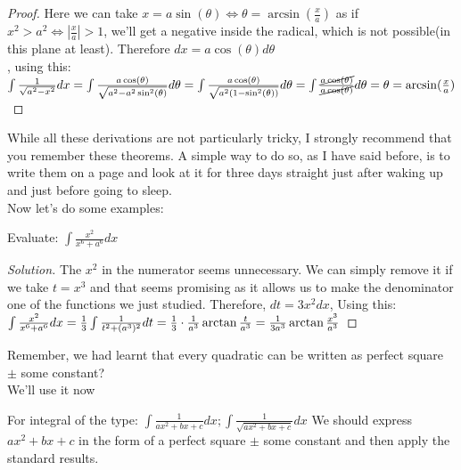\begin{proof}
    Here we can take $x=a\sin(\theta) \iff \theta = \arcsin(\frac{x}{a})$ as if $x^2>a^2 \iff |\frac{x}{a}|>1$, we'll get a negative inside the radical, which is not possible(in this plane at least). Therefore $dx=a\cos(\theta)d\theta$\\, using this:\\
    $
    \int \frac{1}{\sqrt{a^2-x^2}} dx\\
    = \int \frac{a\cos(\theta)}{\sqrt{a^2-a^2\sin^2(\theta)}} d\theta\\
    = \int \frac{a\cos(\theta)}{\sqrt{a^2(1-\sin^2(\theta))}}d\theta\\
    = \int \frac{\cancel{a\cos(\theta)}}{\cancel{a\cos(\theta)}}d\theta\\
    = \theta \\
    = \arcsin(\frac{x}{a})
    $
\end{proof}
While all these derivations are not particularly tricky, I strongly recommend that you remember these theorems. A simple way to do so, as I have said before, is to write them on a page and look at it for three days straight just after waking up and just before going to sleep.\\
Now let's do some examples:\\
\begin{example}
    Evaluate: $\int \frac{x^2}{x^6+a^6} dx$
\end{example}
\begin{proof}
    [Solution]
    The $x^2$ in the numerator seems unnecessary. We can simply remove it if we take $t=x^3$ and that seems promising as it allows us to make the denominator one of the functions we just studied. Therefore, $dt=3x^2dx$, Using this:\\
    $
    \int \frac{x^2}{x^6+a^6} dx\\
    = \frac{1}{3} \int \frac{1}{t^2+(a^3)^2} dt\\
    = \frac{1}{3} \cdot \frac{1}{a^3} \arctan{\frac{t}{a^3}}\\
    = \frac{1}{3a^3} \arctan{\frac{x^3}{a^3}}
    $
\end{proof}
Remember, we had learnt that every quadratic can be written as perfect square $\pm$ some constant?\\
We'll use it now\\
\begin{theorem}
    For integral of the type: $\int \frac{1}{ax^2+bx+c} dx; \int \frac{1}{\sqrt{ax^2+bx+c}} dx $
    We should express $ax^2+bx+c$ in the form of a perfect square $\pm$ some constant and then apply the standard results.\\
\end{theorem}
